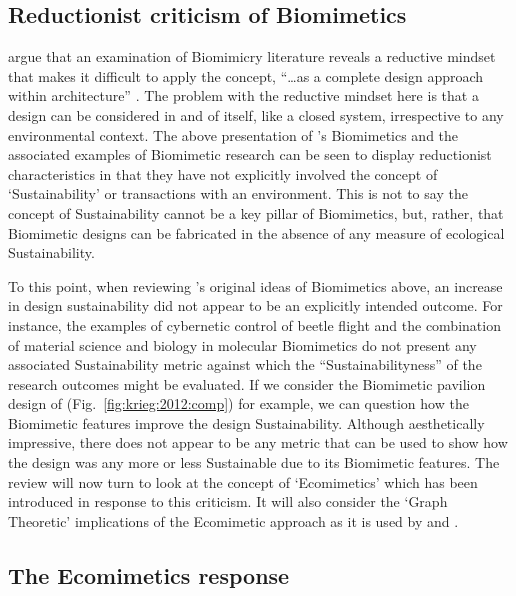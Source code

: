 \subsection{Reductionist criticism of Biomimetics}

\citeauthor{gamage_can_2011} argue that an examination of Biomimicry literature reveals a reductive mindset that makes it difficult to apply the concept, ``\dots as a complete design approach within architecture'' \cite[p.~1]{gamage_can_2011}. The problem with the reductive mindset here is that a design can be considered in and of itself, like a closed system, irrespective to any environmental context. The above presentation of \citeauthor{schmitt_signals_1963}'s Biomimetics and the associated examples of Biomimetic research can be seen to display reductionist characteristics in that they have not explicitly involved the concept of `Sustainability' or transactions with an environment. This is not to say the concept of Sustainability cannot be a key pillar of Biomimetics, but, rather, that Biomimetic designs can be fabricated in the absence of any measure of ecological Sustainability. 

To this point, when reviewing \citeauthor{schmitt_signals_1963}'s original ideas of Biomimetics above, an increase in design sustainability did not appear to be an explicitly intended outcome. For instance, the examples of cybernetic control of beetle flight and the combination of material science and biology in molecular Biomimetics do not present any associated Sustainability metric against which the ``Sustainabilityness'' of the research outcomes might be evaluated. If we consider the Biomimetic pavilion design of \citeauthor{krieg_computational_2012} (Fig.~\ref{fig:krieg:2012:comp}) for example, we can question how the Biomimetic features improve the design Sustainability. Although aesthetically impressive, there does not appear to be any metric that can be used to show how the design was any more or less Sustainable due to its Biomimetic features. The review will now turn to look at the concept of `Ecomimetics' which has been introduced in response to this criticism. It will also consider the `Graph Theoretic' implications of the Ecomimetic approach as it is used by \cite{holguera_ecomimetics_2014} and \cite{garcia-holguera_ecomimetics_2018}.

\subsection{The Ecomimetics response}

